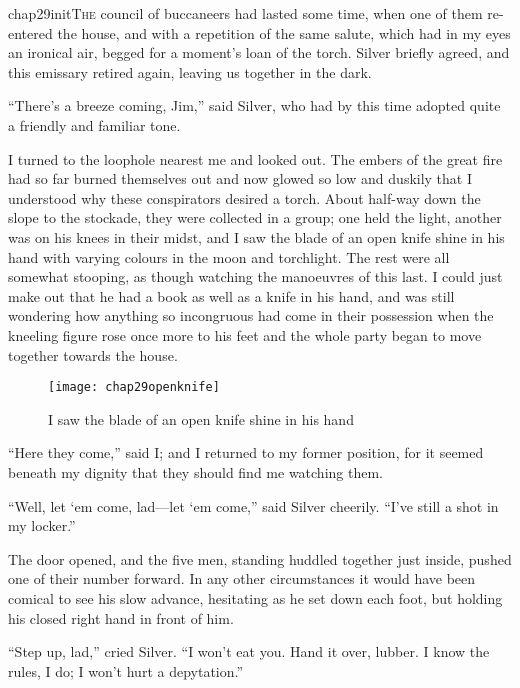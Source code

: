 
   \lettrine[lines=4,image=true]{chap29initT}{he} council of buccaneers had lasted some time, when one of them re-entered the house, and with a repetition of the same salute, which had in my eyes an ironical air, begged for a moment’s loan of the torch. Silver briefly agreed, and this emissary retired again, leaving us together in the dark.

\enquote{There’s a breeze coming, Jim,} said Silver, who had by this time adopted quite a friendly and familiar tone.

I turned to the loophole nearest me and looked out. The embers of the great fire had so far burned themselves out and now glowed so low and duskily that I understood why these conspirators desired a torch. About half-way down the slope to the stockade, they were collected in a group; one held the light, another was on his knees in their midst, and I saw the blade of an open knife shine in his hand with varying colours in the moon and torchlight. The rest were all somewhat stooping, as though watching the manoeuvres of this last. I could just make out that he had a book as well as a knife in his hand, and was still wondering how anything so incongruous had come in their possession when the kneeling figure rose once more to his feet and the whole party began to move together towards the house.

\begin{figure}[p]
\centering
\texttt{[image: chap29openknife]}
\caption{I saw the blade of an open knife shine in his hand}
\end{figure} 

\enquote{Here they come,} said I; and I returned to my former position, for it seemed beneath my dignity that they should find me watching them.

\enquote{Well, let `em come, lad---let `em come,} said Silver cheerily. \enquote{I’ve still a shot in my locker.}

The door opened, and the five men, standing huddled together just inside, pushed one of their number forward. In any other circumstances it would have been comical to see his slow advance, hesitating as he set down each foot, but holding his closed right hand in front of him.

\enquote{Step up, lad,} cried Silver. \enquote{I won’t eat you. Hand it over, lubber. I know the rules, I do; I won’t hurt a depytation.}

